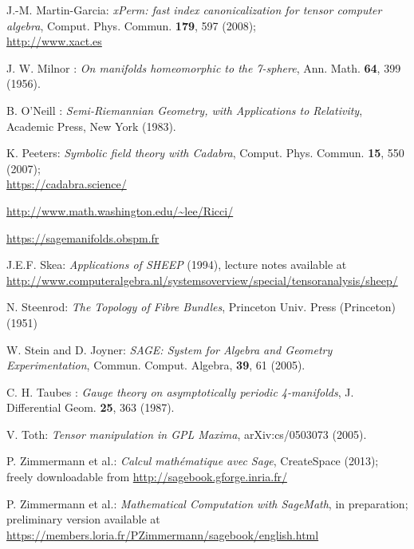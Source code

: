 \begin{thebibliography}{123}
J.-M. Martin-Garcia: {\em xPerm: fast index canonicalization for tensor computer algebra}, Comput. Phys. Commun. {\bf 179}, 597 (2008);\\
\url{http://www.xact.es}

J. W. Milnor : {\em On manifolds homeomorphic to the 7-sphere},
Ann. Math. {\bf 64}, 399 (1956).

B. O'Neill : {\em Semi-Riemannian Geometry, with Applications to Relativity},
Academic Press, New York (1983).

K. Peeters: {\em Symbolic field theory with Cadabra},
Comput. Phys. Commun. {\bf 15}, 550 (2007);\\
\url{https://cadabra.science/}

\url{http://www.math.washington.edu/~lee/Ricci/}

\url{https://sagemanifolds.obspm.fr}

J.E.F. Skea: \emph{Applications of SHEEP} (1994), lecture notes available at
\url{http://www.computeralgebra.nl/systemsoverview/special/tensoranalysis/sheep/}

N. Steenrod: \emph{The Topology of Fibre Bundles}, Princeton Univ. Press (Princeton) (1951)

W. Stein and D. Joyner: {\em SAGE: System for Algebra and Geometry Experimentation},
Commun. Comput. Algebra, {\bf 39}, 61 (2005).

C. H. Taubes : {\em Gauge theory on asymptotically periodic 4-manifolds},
J. Differential Geom. {\bf 25}, 363 (1987).

V. Toth: {\em Tensor manipulation in GPL Maxima},
arXiv:cs/0503073 (2005).

P. Zimmermann et al.: {\it Calcul math\'ematique avec Sage}, CreateSpace (2013);
freely downloadable from \url{http://sagebook.gforge.inria.fr/}

P. Zimmermann et al.: {\it Mathematical Computation with SageMath},
in preparation; preliminary version available at
\url{https://members.loria.fr/PZimmermann/sagebook/english.html}

\end{thebibliography}
